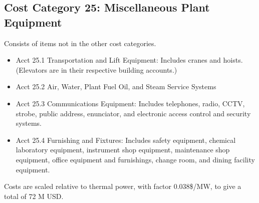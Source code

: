 \subsection{Cost Category 25: Miscellaneous Plant Equipment}  %

Consists of items not in the other cost categories.

\begin{itemize}

\item Acct 25.1 Transportation and Lift Equipment: Includes cranes and hoists. (Elevators are
in their respective building accounts.)

\item  Acct 25.2 Air, Water, Plant Fuel Oil, and Steam Service Systems

\item  Acct 25.3 Communications Equipment: Includes telephones, radio, CCTV, strobe, public
address, enunciator, and electronic access control and security systems.

\item  Acct 25.4 Furnishing and Fixtures: Includes safety equipment, chemical laboratory
equipment, instrument shop equipment, maintenance shop equipment, office
equipment and furnishings, change room, and dining facility equipment.

\end{itemize}

Costs are scaled relative to thermal power, with factor 0.038\$/MW, to give a total of 72 M USD. 